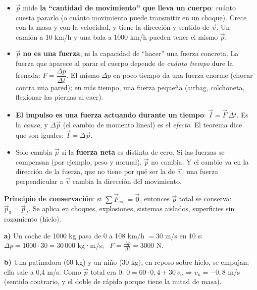 \documentclass[11pt,a4paper]{article}
\begin{document}
\begin{clave}[title={Interpretación del momento lineal y del impulso}]
\begin{itemize}[itemsep=2pt]
  \item $\vec p$ mide \textbf{la ``cantidad de movimiento'' que lleva un cuerpo}: cuánto cuesta pararlo (o cuánto movimiento puede transmitir en un choque). Crece con la masa y con la velocidad, y tiene la dirección y sentido de $\vec v$. Un camión a 10 km/h y una bala a 1000 km/h pueden tener el mismo $\vec p$.
  \item $\vec p$ \textbf{no es una fuerza}, ni la capacidad de ``hacer'' una fuerza concreta. La fuerza que aparece al parar el cuerpo depende de \emph{cuánto tiempo} dure la frenada: $F=\dfrac{\Delta p}{\Delta t}$. El mismo $\Delta p$ en poco tiempo da una fuerza enorme (chocar contra una pared); en más tiempo, una fuerza pequeña (airbag, colchoneta, flexionar las piernas al caer).
  \item \textbf{El impulso es una fuerza actuando durante un tiempo}: $\vec I=\vec F\,\Delta t$. Es la \emph{causa}, y $\Delta\vec p$ (el cambio de momento lineal) es el \emph{efecto}. El teorema dice que son iguales: $\vec I=\Delta\vec p$.
  \item Solo cambia $\vec p$ si la \textbf{fuerza neta} es distinta de cero. Si las fuerzas se compensan (por ejemplo, peso y normal), $\vec p$ no cambia. Y el cambio va en la dirección de la fuerza, que no tiene por qué ser la de $\vec v$: una fuerza perpendicular a $\vec v$ cambia la dirección del movimiento.
\end{itemize}
\end{clave}

\textbf{Principio de conservación}: si $\sum\vec F_{\text{ext}}=\vec 0$, entonces $\vec p$ total se conserva: $\vec p_0=\vec p_f$. Se aplica en choques, explosiones, sistemas aislados, superficies sin rozamiento (hielo).

\begin{ejemplo}[title={Ejemplos}]
\textbf{a)} Un coche de 1000 kg pasa de 0 a 108 km/h $=30$ m/s en 10 s: $\Delta p=1000\cdot30=30\,000$ kg·m/s; \ $F=\frac{\Delta p}{\Delta t}=3000$ N.

\textbf{b)} Una patinadora (60 kg) y un niño (30 kg), en reposo sobre hielo, se empujan; ella sale a 0,4 m/s. Como $\vec p$ total era 0:
$0=60\cdot0{,}4+30\,v_n\Rightarrow v_n=-0{,}8$ m/s (sentido contrario, y el doble de rápido porque tiene la mitad de masa).
\end{ejemplo}
\end{document}
